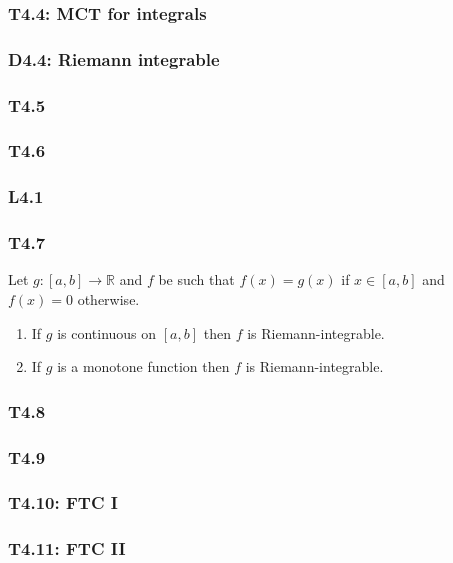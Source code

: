 \documentclass{article}
\begin{document}
\begin{multicols*}{3}
\subsubsection*{T4.4: MCT for integrals}

\subsubsection*{D4.4: Riemann integrable}

\subsubsection*{T4.5}

\subsubsection*{T4.6}

\subsubsection*{L4.1}

\subsubsection*{T4.7}
Let $g:[a,b]\rightarrow\mathbb{R}$
and $f$ be such that $f(x)=g(x)$ if $x\in[a,b]$
and $f(x)=0$ otherwise.
\begin{enumerate}
    \item If $g$ is continuous on $[a,b]$
    then $f$ is Riemann-integrable.

    \item If $g$ is a monotone function
    then $f$ is Riemann-integrable.
\end{enumerate}

\subsubsection*{T4.8}

\subsubsection*{T4.9}

\subsubsection*{T4.10: FTC I}

\subsubsection*{T4.11: FTC II}


\end{multicols*}
\end{document}
